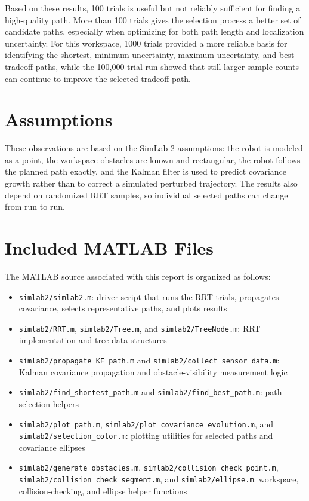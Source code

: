 \documentclass[11pt]{article}
\begin{document}
Based on these results, 100 trials is useful but not reliably sufficient for
finding a high-quality path. More than 100 trials gives the selection process a
better set of candidate paths, especially when optimizing for both path length
and localization uncertainty. For this workspace, 1000 trials provided a more
reliable basis for identifying the shortest, minimum-uncertainty,
maximum-uncertainty, and best-tradeoff paths, while the 100,000-trial run
showed that still larger sample counts can continue to improve the selected
tradeoff path.

\section{Assumptions}
These observations are based on the SimLab 2 assumptions: the robot is modeled
as a point, the workspace obstacles are known and rectangular, the robot
follows the planned path exactly, and the Kalman filter is used to predict
covariance growth rather than to correct a simulated perturbed trajectory. The
results also depend on randomized RRT samples, so individual selected paths can
change from run to run.

\section{Included MATLAB Files}
The MATLAB source associated with this report is organized as follows:
\begin{itemize}[leftmargin=1.5em]
    \item \texttt{simlab2/simlab2.m}: driver script that runs the RRT trials,
    propagates covariance, selects representative paths, and plots results
    \item \texttt{simlab2/RRT.m}, \texttt{simlab2/Tree.m}, and
    \texttt{simlab2/TreeNode.m}: RRT implementation and tree data structures
    \item \texttt{simlab2/propagate\_KF\_path.m} and
    \texttt{simlab2/collect\_sensor\_data.m}: Kalman covariance propagation
    and obstacle-visibility measurement logic
    \item \texttt{simlab2/find\_shortest\_path.m} and
    \texttt{simlab2/find\_best\_path.m}: path-selection helpers
    \item \texttt{simlab2/plot\_path.m},
    \texttt{simlab2/plot\_covariance\_evolution.m}, and
    \texttt{simlab2/selection\_color.m}: plotting utilities for selected paths
    and covariance ellipses
    \item \texttt{simlab2/generate\_obstacles.m},
    \texttt{simlab2/collision\_check\_point.m},
    \texttt{simlab2/collision\_check\_segment.m}, and
    \texttt{simlab2/ellipse.m}: workspace, collision-checking, and ellipse
    helper functions
\end{itemize}
\end{document}
